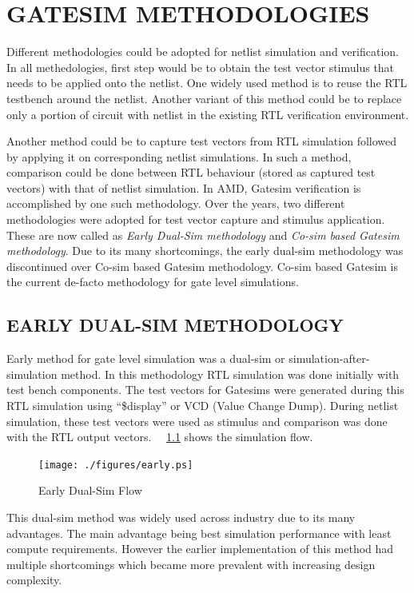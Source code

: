 \chapter{GATESIM METHODOLOGIES}
\label{chap:methodologies.tex}

Different methodologies could be adopted for netlist simulation and verification. In all methedologies, first step would be to obtain the test vector stimulus that needs to be applied onto the netlist. One widely used method is to reuse the RTL testbench around the netlist. Another variant of this method could be to replace only a portion of circuit with netlist in the existing RTL verification environment.

Another method could be to capture test vectors from RTL simulation followed by applying it on corresponding netlist simulations. In such a method, comparison could be done between RTL behaviour (stored as captured test vectors) with that of netlist simulation.  In AMD, Gatesim verification is accomplished by one such methodology. Over the years, two different methodologies were adopted for test vector capture and stimulus application. These are now called as {\it Early Dual-Sim methodology} and {\it Co-sim based Gatesim methodology}. Due to its many shortcomings, the early dual-sim methodology was discontinued over Co-sim based Gatesim methodology. Co-sim based Gatesim is the current de-facto methodology for gate level simulations.


\section{EARLY DUAL-SIM METHODOLOGY}
Early method for gate level simulation was a dual-sim or simulation-after-simulation method. In this methodology RTL simulation was done initially with test bench components. The test vectors for Gatesims were generated during this RTL simulation using ``\$display'' or VCD (Value Change Dump). During netlist simulation, these test vectors were used as stimulus and comparison was done with the RTL output vectors. ~\figurename{~\ref{fig:early.ps}} shows the simulation flow. %

\begin{figure}[h]
\centering
\texttt{[image: ./figures/early.ps]}
\caption{Early Dual-Sim Flow}
\label{fig:early.ps}
\end{figure}

This dual-sim method was widely used across industry due to its many advantages. The main advantage being best simulation performance with least compute requirements. However the earlier implementation of this method had multiple shortcomings which became more prevalent with increasing design complexity.
